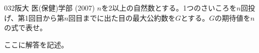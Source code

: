 \begin{prob}{032}{}{阪大 医(保健)学部 (2007)}
 $n$を2以上の自然数とする。1つのさいころを$n$回投げ、第1回目から第$n$回目までに出た目の最大公約数を$G$とする。$G$の期待値を$n$の式で表せ。
\end{prob}
ここに解答を記述。